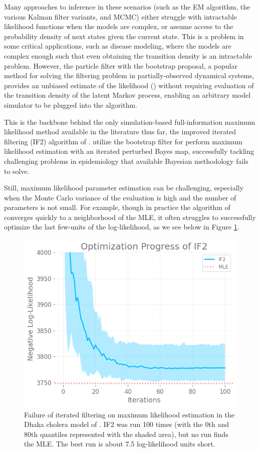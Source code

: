 \documentclass{article}
\begin{document}
Many approaches to inference in these scenarios (such as the EM algorithm, the various Kalman filter variants, and MCMC) either struggle with intractable likelihood functions when the models are complex, or assume access to the probability density of next states given the current state. This is a problem in some critical applications, such as disease modeling, where the models are complex enough such that even obtaining the transition density is an intractable problem. However, the particle filter with the bootstrap proposal, a popular method for solving the filtering problem in partially-observed dynamical systems, provides an unbiased estimate of the likelihood (\cite{delmoral2004feynman}) without requiring evaluation of the transition density of the latent Markov process, enabling an arbitrary model simulator to be plugged into the algorithm.

This is the backbone behind the only simulation-based full-information maximum likelihood method available in the literature thus far, the improved iterated filtering (IF2) algorithm of \citet{ionides15}. \citet{ionides15} utilize the bootstrap filter for perform maximum likelihood estimation with an iterated perturbed Bayes map, successfully tackling challenging problems in epidemiology that available Bayesian methodology fails to solve. 

Still, maximum likelihood parameter estimation can be challenging, especially when the Monte Carlo variance of the evaluation is high and the number of parameters is not small. For example, though in practice the algorithm of \citet{ionides15} converges quickly to a neighborhood of the MLE, it often struggles to successfully optimize the last few-units of the log-likelihood, as we see below in Figure \ref{fig:if2fail}.

\begin{figure}[H]
    \centering
    \includegraphics[scale=0.5]{imgs/095/if2fail.png}
    \caption{Failure of iterated filtering on maximum likelihood estimation in the Dhaka cholera model of \cite{king08}. IF2 was run 100 times (with the 0th and 80th quantiles represented with the shaded area), but no run finds the MLE. The best run is about 7.5 log-likelihood units short. }
    \label{fig:if2fail}
\end{figure}
\end{document}
